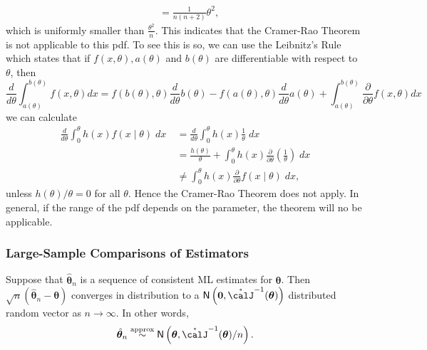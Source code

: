 \begin{exam}
\begin{align*}
        & = \frac{1}{n(n+2)} \theta^2,
    \end{align*}
    which is uniformly smaller than $\frac{\theta^2}{n}$. This indicates that the Cramer-Rao Theorem is not applicable to this pdf. To see this is so, we can use the Leibnitz's Rule which states that if $f(x , \theta), a(\theta)$ and $b(\theta)$ are differentiable with respect to $\theta$, then
    \begin{equation*}
        \frac{d}{d \theta} \int_{a(\theta)}^{b(\theta)} f(x, \theta) d x=f(b(\theta), \theta) \frac{d}{d \theta} b(\theta)-f(a(\theta), \theta) \frac{d}{d \theta} a(\theta)+\int_{a(\theta)}^{b(\theta)} \frac{\partial}{\partial \theta} f(x, \theta) d x
    \end{equation*}
    we can calculate
    \begin{align*}
        \frac{d}{d \theta} \int_{0}^{\theta} h(x) f(x \mid \theta) \; d x \
         & =\frac{d}{d \theta} \int_{0}^{\theta} h(x) \frac{1}{\theta} \; d x                                                     \\
         & = \frac{h(\theta)}{\theta}+\int_{0}^{\theta} h(x) \frac{\partial}{\partial \theta}\left(\frac{1}{\theta}\right) \; d x \\
         & \neq \int_{0}^{\theta} h(x) \frac{\partial}{\partial \theta} f(x \mid \theta) \; d x,
    \end{align*}
    unless $h(\theta) / \theta = 0$ for all $\theta$. Hence the Cramer-Rao Theorem does not apply. In general, if the range of the pdf depends on the parameter, the theorem will no be applicable.
\end{exam}

\subsubsection*{Large-Sample Comparisons of Estimators}

\begin{thm} \label{thm: large_samp_est}
    Suppose that $\hat{\bm{\theta}}_n$ is a sequence of consistent ML estimates for $\bm{\theta}$. Then $\sqrt{n} \left( \hat{\bm{\theta}}_n - \bm{\theta} \right)$ converges in distribution to a $\Nor \left( \bm{0} , \mathring{\calJ}^{-1} (\bm{\theta}) \right)$ distributed random vector as $n \to \infty$. In other words,
    \begin{align*}
        \hat{\bm{\theta}}_n \overset{\text{approx}}{\sim} \Nor \left( \bm{\theta} , \mathring{\calJ}^{-1} (\bm{\theta}) / n \right) .
    \end{align*}
\end{thm}

